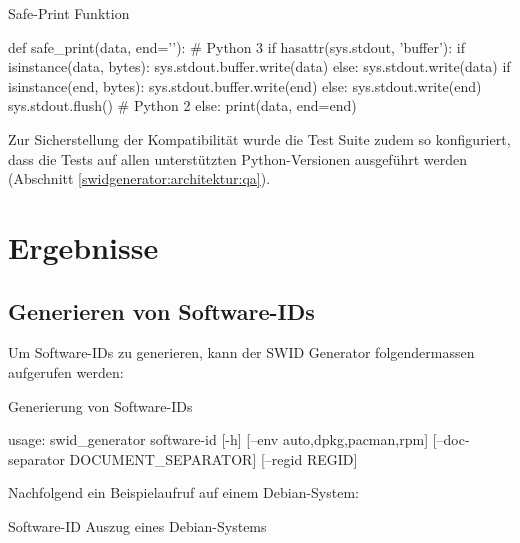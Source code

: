 \begin{listing}[h]
\caption{Safe-Print Funktion}
\label{safeprint}
\begin{pythoncode}
def safe_print(data, end='\n'):
    # Python 3
    if hasattr(sys.stdout, 'buffer'):
        if isinstance(data, bytes):
            sys.stdout.buffer.write(data)
        else:
            sys.stdout.write(data)
        if isinstance(end, bytes):
            sys.stdout.buffer.write(end)
        else:
            sys.stdout.write(end)
        sys.stdout.flush()
    # Python 2
    else:
        print(data, end=end)
\end{pythoncode}
\end{listing}

Zur Sicherstellung der Kompatibilität wurde die Test Suite zudem so
konfiguriert, dass die Tests auf allen unterstützten Python-Versionen ausgeführt
werden (Abschnitt \ref{swidgenerator:architektur:qa}).


\section{Ergebnisse}

\subsection{Generieren von Software-IDs}

Um Software-IDs zu generieren, kann der SWID Generator folgendermassen aufgerufen werden:

\begin{listing}[H]
\caption{Generierung von Software-IDs}
\begin{textcode}
usage: swid_generator software-id [-h] [--env {auto,dpkg,pacman,rpm}]
                                  [--doc-separator DOCUMENT_SEPARATOR]
                                  [--regid REGID]
\end{textcode}
\end{listing}

Nachfolgend ein Beispielaufruf auf einem Debian-System:

\begin{listing}[H]
\caption{Software-ID Auszug eines Debian-Systems}
\end{listing}

